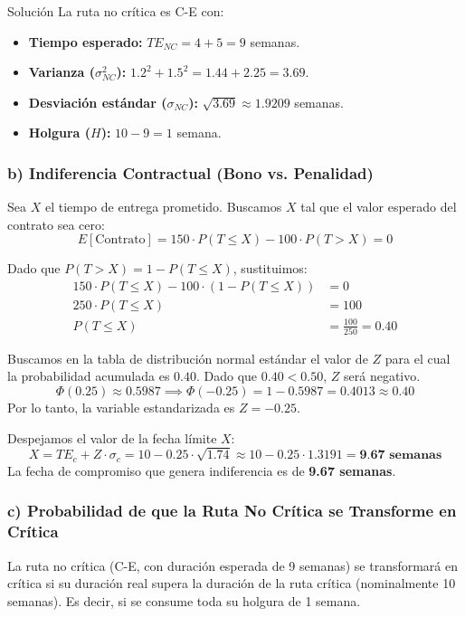 \documentclass[11pt, a4paper]{article}
\begin{document}
\begin{ejercicio}{Solución}
  La ruta no crítica es C-E con:
  \begin{itemize}
    \item \textbf{Tiempo esperado:} $TE_{NC} = 4 + 5 = 9$ semanas.
    \item \textbf{Varianza ($\sigma_{NC}^2$):} $1.2^2 + 1.5^2 = 1.44 + 2.25 = 3.69$.
    \item \textbf{Desviación estándar ($\sigma_{NC}$):} $\sqrt{3.69} \approx 1.9209$ semanas.
    \item \textbf{Holgura ($H$):} $10 - 9 = 1$ semana.
  \end{itemize}

  \subsubsection*{b) Indiferencia Contractual (Bono vs. Penalidad)}
  Sea $X$ el tiempo de entrega prometido. Buscamos $X$ tal que el valor esperado del contrato sea cero:
  \begin{equation*}
    E[\text{Contrato}] = 150 \cdot P(T \le X) - 100 \cdot P(T > X) = 0
  \end{equation*}

  Dado que $P(T > X) = 1 - P(T \le X)$, sustituimos:
  \begin{align*}
    150 \cdot P(T \le X) - 100 \cdot (1 - P(T \le X)) &= 0 \\
    250 \cdot P(T \le X) &= 100 \\
    P(T \le X) &= \frac{100}{250} = 0.40
  \end{align*}

  Buscamos en la tabla de distribución normal estándar el valor de $Z$ para el cual la probabilidad acumulada es $0.40$. Dado que $0.40 < 0.50$, $Z$ será negativo.
  \begin{equation*}
    \Phi(0.25) \approx 0.5987 \implies \Phi(-0.25) = 1 - 0.5987 = 0.4013 \approx 0.40
  \end{equation*}
  Por lo tanto, la variable estandarizada es $Z = -0.25$.

  Despejamos el valor de la fecha límite $X$:
  \begin{equation*}
    X = TE_c + Z \cdot \sigma_c = 10 - 0.25 \cdot \sqrt{1.74} \approx 10 - 0.25 \cdot 1.3191 = \textbf{9.67 semanas}
  \end{equation*}
  La fecha de compromiso que genera indiferencia es de \textbf{9.67 semanas}.

  \subsubsection*{c) Probabilidad de que la Ruta No Crítica se Transforme en Crítica}
  La ruta no crítica (C-E, con duración esperada de 9 semanas) se transformará en crítica si su duración real supera la duración de la ruta crítica (nominalmente 10 semanas). Es decir, si se consume toda su holgura de 1 semana.


\end{ejercicio}
\end{document}
